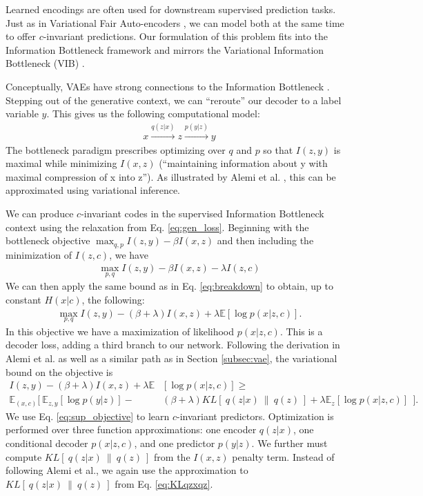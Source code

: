 Learned encodings are often used for downstream supervised prediction tasks. Just as in Variational Fair Auto-encoders \cite{louizos2015variational}, we can model both at the same time to offer $c$-invariant predictions. Our formulation of this problem fits into the Information Bottleneck framework \cite{tishby2000information} and mirrors the Variational Information Bottleneck (VIB) \cite{alemi2016deep}.

Conceptually, VAEs have strong connections to the Information Bottleneck \cite{alemi2016deep}. Stepping out of the generative context, we can ``reroute'' our decoder to a label variable $y$. This gives us the following computational model:
\begin{align}
x \xrightarrow{q(z|x)} z \xrightarrow{p(y|z)} y
\end{align}
The bottleneck paradigm prescribes optimizing over $q$ and $p$ so that $I(z,y)$ is maximal while minimizing $I(x,z)$ (``maintaining information about y with maximal compression of x into z''). As illustrated by Alemi et al. \cite{alemi2016deep}, this can be approximated using variational inference.

We can produce $c$-invariant codes in the supervised Information Bottleneck context using the relaxation from Eq. \ref{eq:gen_loss}. Beginning with the bottleneck objective $\max_{q,p} I(z,y) - \beta I(x,z)$ and then including the minimization of $I(z,c)$, we have
\begin{align}
\max_{p,q} I(z,y) - \beta I(x,z) - \lambda I(z,c)
\end{align}
We can then apply the same bound as in Eq. \ref{eq:breakdown} to obtain, up to constant $H(x|c)$, the following:
\begin{align}
\max_{p,q} I(z,y) - (\beta + \lambda) I(x,z) + \lambda\mathbb{E}[\log p(x|z,c) ].
\end{align}
In this objective we have a maximization of likelihood $p(x|z,c)$. This is a decoder loss, adding a third branch to our network. Following the derivation in Alemi et al. \cite{alemi2016deep} as well as a similar path as in Section \ref{subsec:vae}, the variational bound on the objective is
\begin{align}
I(z,y) - (\beta + \lambda) I(x,z) + \lambda\mathbb{E} &[\log p(x|z,c) ] \geq \nonumber\\
\mathbb{E}_{(x,c)}[ ~ \mathbb{E}_{z,y}[\log p(y|z)]  - &(\beta+\lambda) KL[~q(z|x)~\|~q(z)~] +
\lambda\mathbb{E}_{z}[\log p(x|z,c)] ~~ ]. \label{eq:sup_objective}
\end{align}
We use Eq. \ref{eq:sup_objective} to learn $c$-invariant predictors. Optimization is performed over three function approximations: one encoder $q(z|x)$, one conditional decoder $p(x|z,c)$, and one predictor $p(y|z)$. We further must compute $KL[~q(z|x)~\|~q(z)~]$ from the $I(x,z)$ penalty term. Instead of following Alemi et al.\cite{alemi2016deep}, we again use the approximation to $KL[~q(z|x)~\|~q(z)~]$ from Eq. \ref{eq:KLqzxqz}.


